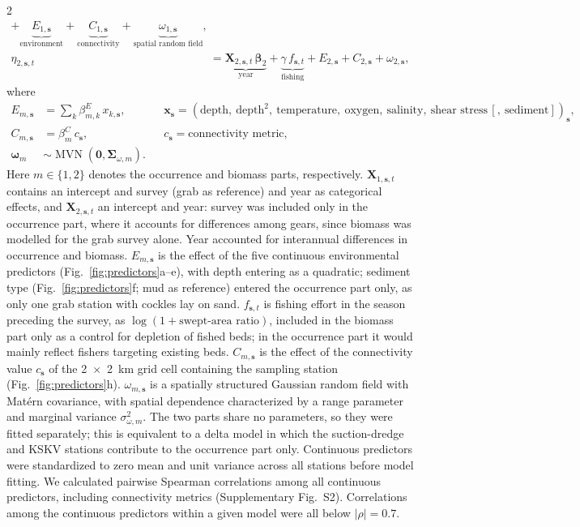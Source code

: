 \begin{spacing}{2}
\begin{align}
+ \underbrace{E_{1,\mathbf{s}}}_{\text{environment}}
+ \underbrace{C_{1,\mathbf{s}}}_{\text{connectivity}}
+ \underbrace{\omega_{1,\mathbf{s}}}_{\text{spatial random field}},\\
\eta_{2,\mathbf{s},t} &=
\underbrace{\mathbf{X}_{2,\mathbf{s},t}\,\boldsymbol{\beta}_2}_{\text{year}}
+ \underbrace{\gamma\, f_{\mathbf{s},t}}_{\text{fishing}}
+ E_{2,\mathbf{s}} + C_{2,\mathbf{s}} + \omega_{2,\mathbf{s}},
\end{align}
where
\begin{align}
E_{m,\mathbf{s}} &= \sum_{k} \beta^{E}_{m,k}\, x_{k,\mathbf{s}},
&& \mathbf{x}_{\mathbf{s}} = (\text{depth},\ \text{depth}^2,\ \text{temperature},\ \text{oxygen},\ \text{salinity},\ \text{shear stress}\,[,\ \text{sediment}])_{\mathbf{s}},\\
C_{m,\mathbf{s}} &= \beta^{C}_m\, c_{\mathbf{s}},
&& c_{\mathbf{s}} = \text{connectivity metric},\\
\boldsymbol{\omega}_m &\sim \operatorname{MVN}\!\left(\mathbf{0}, \boldsymbol{\Sigma}_{\omega,m}\right).
\end{align}
Here $m \in \{1, 2\}$ denotes the occurrence and biomass parts, respectively. $\mathbf{X}_{1,\mathbf{s},t}$ contains an intercept and survey (grab as reference) and year as categorical effects, and $\mathbf{X}_{2,\mathbf{s},t}$ an intercept and year: survey was included only in the occurrence part, where it accounts for differences  among gears, since biomass was modelled for the grab survey alone. Year accounted for interannual differences in occurrence and biomass. $E_{m,\mathbf{s}}$ is the effect of the five continuous environmental predictors (Fig.~\ref{fig:predictors}a--e), with depth entering as a quadratic; sediment type (Fig.~\ref{fig:predictors}f; mud as reference) entered the occurrence part only, as only one grab station with cockles lay on sand. $f_{\mathbf{s},t}$ is fishing effort in the season preceding the survey, as $\log(1 + \text{swept-area ratio})$, included in the biomass part only as a control for depletion of fished beds; in the occurrence part it would mainly reflect fishers targeting existing beds. $C_{m,\mathbf{s}}$ is the effect of the connectivity value $c_{\mathbf{s}}$ of the 2~$\times$~2~km grid cell containing the sampling station (Fig.~\ref{fig:predictors}h). $\omega_{m,\mathbf{s}}$ is a spatially structured Gaussian random field with Matérn covariance, with spatial dependence characterized by a range parameter and marginal variance $\sigma^2_{\omega,m}$. The two parts share no parameters, so they were fitted separately; this is equivalent to a delta model in which the suction-dredge and KSKV stations contribute to the occurrence part only. Continuous predictors were standardized to zero mean and unit variance across all stations before model fitting. We calculated pairwise Spearman correlations among all continuous predictors, including connectivity metrics (Supplementary Fig.~S2). Correlations among the continuous predictors within a given model were all below $|\rho| = 0.7$.


\end{spacing}
